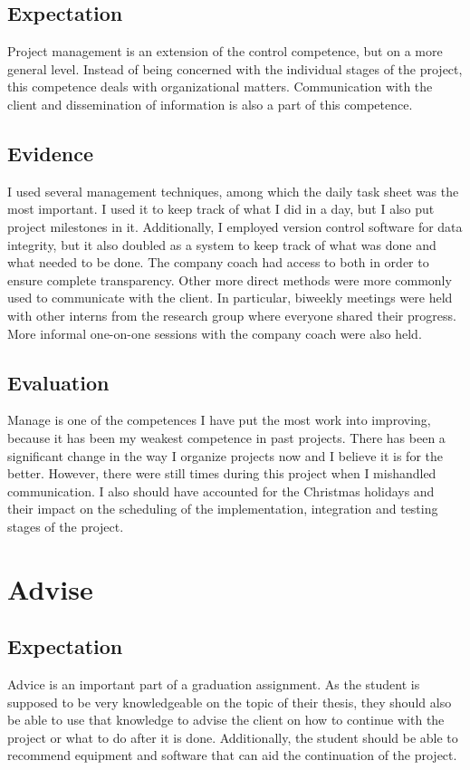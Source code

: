 \documentclass{report}
\begin{document}
\subsection{Expectation}
Project management is an extension of the control competence, but on a more general level. Instead of being concerned with the individual stages of the project, this competence deals with organizational matters. Communication with the client and dissemination of information is also a part of this competence.

\subsection{Evidence}
I used several management techniques, among which the daily task sheet was the most important. I used it to keep track of what I did in a day, but I also put project milestones in it. Additionally, I employed version control software for data integrity, but it also doubled as a system to keep track of what was done and what needed to be done. The company coach had access to both in order to ensure complete transparency. Other more direct methods were more commonly used to communicate with the client. In particular, biweekly  meetings were held with other interns from the research group where everyone shared their progress. More informal one-on-one sessions with the company coach were also held.

\subsection{Evaluation}
Manage is one of the competences I have put the most work into improving, because it has been my weakest competence in past projects. There has been a significant change in the way I organize projects now and I believe it is for the better. However, there were still times during this project when I mishandled communication. I also should have accounted for the Christmas holidays and their impact on the scheduling of the implementation, integration and testing stages of the project.

\section{Advise}%
\subsection{Expectation}
Advice is an important part of a graduation assignment. As the student is supposed to be very knowledgeable on the topic of their thesis, they should also be able to use that knowledge to advise the client on how to continue with the project or what to do after it is done. Additionally, the student should be able to recommend equipment and software that can aid the continuation of the project.
\end{document}
